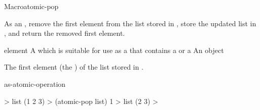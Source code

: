 \begin{functiondoc}{Macro}{atomic-pop}{ \returns{}
    }
%

\fnsyntax

\fnpurpose As an , remove the first element
from the list stored in , store the updated list in
, and return the removed first element.

\fnpackage {}

\fnmodule {}

\fnargs
\begin{args}{element}
\arg[place] A  which is suitable for use as a
   that contains a  or
   a 
\arg[element] An object
\end{args}

\fnreturns The first element (the ) of the list stored in
.

\begin{alsos}{as-atomic-operation}
\end{alsos}

\fnexample
%
\W\supp
\begin{example}
  > list
  (1 2 3)
  > (atomic-pop list)
  1
  > list
  (2 3)
  >
\end{example}

\end{functiondoc}


